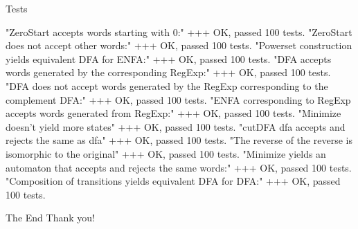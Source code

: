 \documentclass[aspectratio=169]{beamer}
\begin{document}
		
	\begin{frame}[fragile]{Tests}
		\begin{code}
"ZeroStart accepts words starting with 0:"
+++ OK, passed 100 tests.
"ZeroStart does not accept other words:"
+++ OK, passed 100 tests.
"Powerset construction yields equivalent DFA for ENFA:"
+++ OK, passed 100 tests.
"DFA accepts words generated by the corresponding RegExp:"
+++ OK, passed 100 tests.
"DFA does not accept words generated by the RegExp corresponding to the complement DFA:"
+++ OK, passed 100 tests.
"ENFA corresponding to RegExp accepts words generated from RegExp:"
+++ OK, passed 100 tests.
"Minimize doesn't yield more states"
+++ OK, passed 100 tests.
"cutDFA dfa accepts and rejects the same as dfa"
+++ OK, passed 100 tests.
"The reverse of the reverse is isomorphic to the original"
+++ OK, passed 100 tests.
"Minimize yields an automaton that accepts and rejects the same words:"
+++ OK, passed 100 tests.
"Composition of transitions yields equivalent DFA for DFA:"
+++ OK, passed 100 tests.
\end{code}
	\end{frame}
	\begin{frame}[fragile]{The End}
		\huge Thank you!
	\end{frame}
\end{document}
